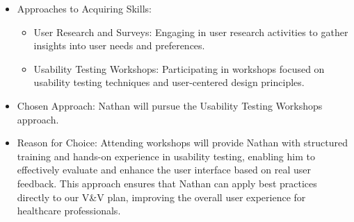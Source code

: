 \documentclass[12pt, titlepage]{article}
\begin{document}
\begin{enumerate}
\begin{enumerate}
\begin{itemize}
      \item[-] Approaches to Acquiring Skills:
      \begin{itemize}
          \item User Research and Surveys: Engaging in user research activities to gather insights into user needs and preferences.
          \item Usability Testing Workshops: Participating in workshops focused on usability testing techniques and user-centered design principles.
      \end{itemize}
      
      \item[-] Chosen Approach: Nathan will pursue the Usability Testing Workshops approach.
      
      \item[-] Reason for Choice: Attending workshops will provide Nathan with structured training and hands-on experience in usability testing, enabling him to effectively evaluate and enhance the user interface based on real user feedback. This approach ensures that Nathan can apply best practices directly to our V\&V plan, improving the overall user experience for healthcare professionals.
  \end{itemize}

\end{enumerate}
\end{enumerate}
\end{document}
